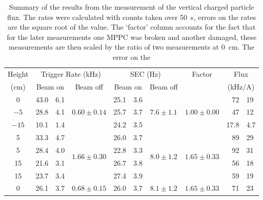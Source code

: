 \begin{table}
    \begin{center}
    \begin{tabular}{ c | r@{\( \pm \)}l | c | r@{\( \pm \)}l | c | c | r@{\( \pm \)}l } 
        Height  &  \multicolumn{3}{c|}{Trigger Rate (kHz)}  
                                                             &  \multicolumn{3}{c|}{SEC (Hz)}  
                                                                            &  Factor  &  \multicolumn{2}{c}{Flux} \\
        (cm)   & \multicolumn{2}{c|}{Beam on}  
                                 & Beam off
                                           &  \multicolumn{2}{c|}{Beam on}  
                                                             &  Beam off  &  &  \multicolumn{2}{c}{(kHz/A)} \\
        \hline
          0     &   43.0 & 6.1   &   \multirow{3}{*}{\( 0.60\pm0.14 \)}
                                           &    25.1 & 3.6   &   \multirow{3}{*}{\( 7.6 \pm 1.1 \)}
                                                                       &    \multirow{3}{*}{\( 1.00\pm0.00 \)}
                                                                                 &   72   & 19   \\
        \(-5\)  &   28.8 & 4.1   &         &    25.7 & 3.7   &         &         &   47   & 12   \\
        \(-15\) &   10.1 & 1.4   &         &    24.2 & 3.5   &         &         &   17.8 &  4.7 \\
        \hline
          5     &   33.3 & 4.7   &   \multirow{4}{*}{\(1.66 \pm 0.30\)}
                                           &    26.0 & 3.7   &   \multirow{4}{*}{\( 8.0\pm 1.2 \)}
                                                                          &    \multirow{4}{*}{\( 1.65\pm0.33 \)}
                                                                               &   89   & 29 \\
          5     &   28.4 & 4.0   &         &    22.8 & 3.3   &            &    &   92   & 31 \\
         15     &   21.6 & 3.1   &         &    26.7 & 3.8   &            &    &   56   & 18 \\
         15     &   23.7 & 3.4   &         &    27.4 & 3.9   &            &    &   59   & 19 \\
         \hline
          0     &   26.1 & 3.7   &   \( 0.68 \pm 0.15 \)   &    26.0 & 3.7   &   \( 8.1 \pm1.2 \)   &    \( 1.65\pm0.33 \)   &   71   & 23 \\
    \end{tabular}
    \end{center}
    \caption{Summary of the results from the measurement of the vertical charged particle flux. The rates were calculated with counts taken over 50~s, errors on the rates are the square root of the value. The `factor' column accounts for the fact that for the later measurements one MPPC was broken and another damaged, these measurements are then scaled by the ratio of two measurements at 0~cm. The error on the }
    \label{label}
\end{table}

